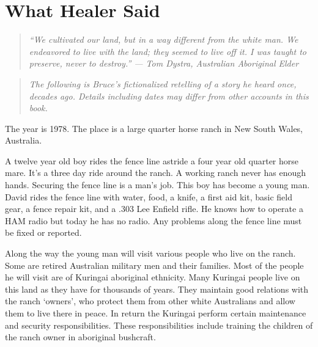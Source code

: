 

\chapter{What Healer Said}
\label{record:healer-said}

\begin{quote}\small\textit{%
``We cultivated our land, but in a way different from the white man. We endeavored to live with the land; they seemed to live off it. I was taught to preserve, never to destroy.'' --- Tom Dystra, Australian Aboriginal Elder
}\end{quote}

\begin{quote}\small\textit{%
The following is Bruce's fictionalized retelling of a story he heard once, decades ago.
Details including dates may differ from other accounts in this book.
}\end{quote}

\vspace{0.5cm}


The year is 1978.  The place is a large quarter horse ranch in New South Wales, Australia.

A twelve year old boy rides the fence line astride a four year old quarter horse mare.  It's a three day ride around the ranch.  A working ranch never has enough hands.  Securing the fence line is a man's job.  This boy has become a young man.  David rides the fence line with water, food, a knife, a first aid kit, basic field gear, a fence repair kit, and a .303 Lee Enfield rifle.  He knows how to operate a HAM radio but today he has no radio. Any problems along the fence line must be fixed or reported.

Along the way the young man will visit various people who live on the ranch.  Some are retired Australian military men and their families.  Most of the people he will visit are of Kuringai aboriginal ethnicity. Many Kuringai people live on this land as they have for thousands of years.  They maintain good relations with the ranch `owners', who protect them from other white Australians and allow them to live there in peace. In return the Kuringai perform certain maintenance and security responsibilities. These responsibilities include training the children of the ranch owner in aboriginal bushcraft.

